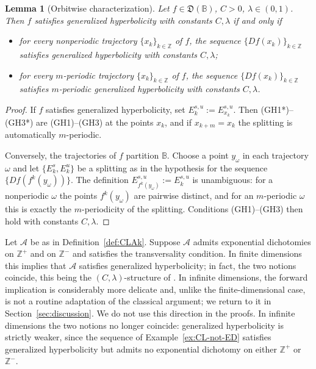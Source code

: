 \documentclass[12pt]{article}
\newcommand{\Bb}{\mathbb{B}}
\newcommand{\Zz}{\mathbb{Z}}
\newcommand{\DUC}{\mathfrak{D}}
\newtheorem{lem}[thm]{Lemma}
\theoremstyle{definition}
\begin{document}
\begin{lem}[Orbitwise characterization]\label{lem:orbitwise}
Let $f \in \DUC(\Bb)$, $C > 0$, $\lambda \in (0,1)$. Then $f$ satisfies generalized
hyperbolicity with constants $C, \lambda$ if and only if
\begin{itemize}
\item for every nonperiodic trajectory $\{x_k\}_{k \in \Zz}$ of $f$, the sequence
$\{Df(x_k)\}_{k \in \Zz}$ satisfies generalized hyperbolicity with constants $C, \lambda$;
\item for every $m$-periodic trajectory $\{x_k\}_{k \in \Zz}$ of $f$, the sequence
$\{Df(x_k)\}_{k \in \Zz}$ satisfies $m$-periodic generalized hyperbolicity with constants
$C, \lambda$.
\end{itemize}
\end{lem}
\begin{proof}
If $f$ satisfies generalized hyperbolicity, set $E^{s,u}_k := E^{s,u}_{x_k}$. Then
{\rm(GH1*)}--{\rm(GH3*)} are {\rm(GH1)}--{\rm(GH3)} at the points $x_k$, and if
$x_{k+m} = x_k$ the splitting is automatically $m$-periodic.

Conversely, the trajectories of $f$ partition $\Bb$. Choose a point $y_\omega$ in each
trajectory $\omega$ and let $\{E^s_k, E^u_k\}$ be a splitting as in the hypothesis for the
sequence $\{Df(f^k(y_\omega))\}$. The definition $E^{s,u}_{f^k(y_\omega)} := E^{s,u}_k$ is
unambiguous: for a nonperiodic $\omega$ the points $f^k(y_\omega)$ are pairwise distinct,
and for an $m$-periodic $\omega$ this is exactly the $m$-periodicity of the splitting.
Conditions {\rm(GH1)}--{\rm(GH3)} then hold with constants $C, \lambda$.
\end{proof}

Let $\mathcal{A}$ be as in Definition~\ref{def:CLAk}. 
Suppose $\mathcal{A}$ admits exponential dichotomies on $\Zz^+$ and on $\Zz^-$ and satisfies the transversality condition. In finite dimensions this implies that $\mathcal{A}$ satisfies generalized hyperbolicity; in fact, the two notions coincide, this being the $(C,\lambda)$-structure of \cite{PilCL}. In infinite dimensions, the forward implication is considerably more delicate and, unlike the finite-dimensional case, is not a routine adaptation of the classical argument; we return to it in Section~\ref{sec:discussion}. We do not use this direction in the proofs. In infinite dimensions the two notions no longer coincide: generalized hyperbolicity is strictly weaker, since the sequence of Example~\ref{ex:CL-not-ED} satisfies generalized hyperbolicity but admits no exponential dichotomy on either $\Zz^+$ or $\Zz^-$.
\end{document}

